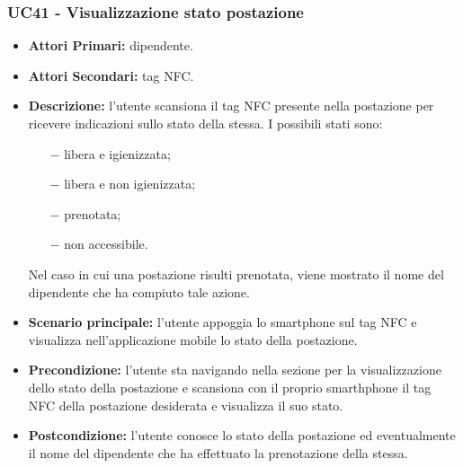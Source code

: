 \subsubsection{ UC41 - Visualizzazione stato postazione}
\begin{itemize}
	\item\textbf{Attori Primari:} dipendente.
	\item\textbf{Attori Secondari:} tag NFC.
	\item\textbf{Descrizione:} l’utente scansiona il tag NFC presente nella postazione per ricevere indicazioni sullo stato della stessa. I possibili stati sono:
	\begin{itemize}
		\item[$-$]libera e igienizzata;
		\item[$-$]libera e non igienizzata;
		\item[$-$]prenotata;
		\item[$-$]non accessibile.
	\end{itemize}
	Nel caso in cui una postazione risulti prenotata, viene mostrato il nome del dipendente che ha compiuto tale azione.
	\item\textbf{Scenario principale:} l’utente appoggia lo smartphone sul tag NFC e visualizza nell'applicazione mobile lo stato della postazione. 
	\item\textbf{Precondizione:} l’utente sta navigando nella sezione per la visualizzazione dello stato della postazione e 
	scansiona con il proprio smarthphone il tag NFC della postazione desiderata e visualizza il suo stato.
	\item\textbf{Postcondizione:} l’utente conosce lo stato della postazione ed eventualmente il nome del dipendente che ha effettuato la prenotazione della stessa.
\end{itemize}

